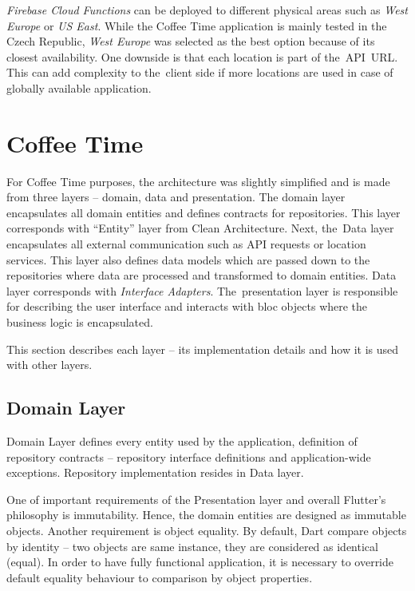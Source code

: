 \textit{Firebase Cloud Functions} can be deployed to different physical areas such as \textit{West Europe} or \textit{US East}. While the Coffee Time application is mainly tested in the Czech Republic, \textit{West Europe} was selected as the best option because of its closest availability. One downside is that each location is part of the~API~URL. This can add complexity to the~client side if more locations are used in case of globally available application. 

\section{Coffee Time}
For Coffee Time purposes, the architecture was slightly simplified and is made from three layers -- domain, data and presentation. The domain layer encapsulates all domain entities and defines contracts for repositories. This layer corresponds with ``Entity'' layer from Clean Architecture. Next, the~Data layer encapsulates all external communication such as API requests or location services. This layer also defines data models which are passed down to the repositories where data are processed and transformed to domain entities. Data layer corresponds with \textit{Interface Adapters}. The~presentation layer is responsible for describing the user interface and interacts with \gls{bloc} objects where the business logic is encapsulated.

This section describes each layer -- its implementation details and how it is used with other layers.  
\subsection{Domain Layer}
Domain Layer defines every entity used by the application, definition of repository contracts -- repository interface definitions and application-wide exceptions. Repository implementation resides in Data layer. 

One of important requirements of the Presentation layer and overall Flutter's philosophy is immutability. Hence, the domain entities are designed as immutable objects. Another requirement is object equality. By default, Dart compare objects by identity -- two objects are same instance, they are considered as identical (equal). In order to have fully functional application, it is necessary to override default equality behaviour to comparison by object properties. 

